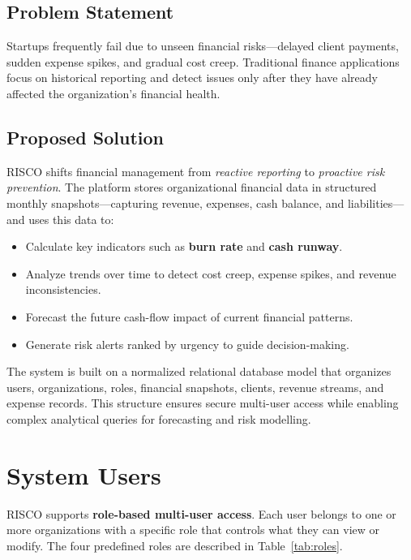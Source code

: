 \documentclass[12pt,a4paper]{article}
\begin{document}
\subsection{Problem Statement}

Startups frequently fail due to unseen financial risks—delayed client payments,
sudden expense spikes, and gradual cost creep. Traditional finance applications
focus on historical reporting and detect issues only after they have already
affected the organization's financial health.

\subsection{Proposed Solution}

RISCO shifts financial management from \emph{reactive reporting} to
\emph{proactive risk prevention}. The platform stores organizational financial
data in structured monthly snapshots—capturing revenue, expenses, cash balance,
and liabilities—and uses this data to:

\begin{itemize}[leftmargin=1.5cm]
    \item Calculate key indicators such as \textbf{burn rate} and
          \textbf{cash runway}.
    \item Analyze trends over time to detect cost creep, expense spikes, and
          revenue inconsistencies.
    \item Forecast the future cash-flow impact of current financial patterns.
    \item Generate risk alerts ranked by urgency to guide decision-making.
\end{itemize}

The system is built on a normalized relational database model that organizes
users, organizations, roles, financial snapshots, clients, revenue streams, and
expense records. This structure ensures secure multi-user access while enabling
complex analytical queries for forecasting and risk modelling.

\section{System Users}

RISCO supports \textbf{role-based multi-user access}. Each user belongs to one
or more organizations with a specific role that controls what they can view or
modify. The four predefined roles are described in Table~\ref{tab:roles}.
\end{document}
